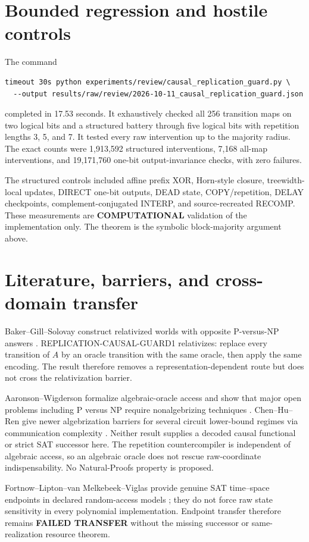 \documentclass[11pt]{article}
\begin{document}
\section{Bounded regression and hostile controls}
The command
\begin{verbatim}
timeout 30s python experiments/review/causal_replication_guard.py \
  --output results/raw/review/2026-10-11_causal_replication_guard.json
\end{verbatim}
completed in 17.53 seconds.  It exhaustively checked all 256 transition maps
on two logical bits and a structured battery through five logical bits with
repetition lengths 3, 5, and 7.  It tested every raw intervention up to the
majority radius.  The exact counts were 1,913,592 structured interventions,
7,168 all-map interventions, and 19,171,760 one-bit output-invariance checks,
with zero failures.

The structured controls included affine prefix XOR, Horn-style closure,
treewidth-local updates, DIRECT one-bit outputs, DEAD state, COPY/repetition,
DELAY checkpoints, complement-conjugated INTERP, and source-recreated RECOMP.
These measurements are \textbf{COMPUTATIONAL} validation of the implementation
only.  The theorem is the symbolic block-majority argument above.

\section{Literature, barriers, and cross-domain transfer}
Baker--Gill--Solovay construct relativized worlds with opposite P-versus-NP
answers \cite{bgs}.  REPLICATION-CAUSAL-GUARD1 relativizes: replace every
transition of $A$ by an oracle transition with the same oracle, then apply the
same encoding.  The result therefore removes a representation-dependent route
but does not cross the relativization barrier.

Aaronson--Wigderson formalize algebraic-oracle access and show that major open
problems including P versus NP require nonalgebrizing techniques \cite{aw}.
Chen--Hu--Ren give newer algebrization barriers for several circuit lower-bound
regimes via communication complexity \cite{chr}.  Neither result supplies a
decoded causal functional or strict SAT successor here.  The repetition
countercompiler is independent of algebraic access, so an algebraic oracle
does not rescue raw-coordinate indispensability.  No Natural-Proofs property
is proposed.

Fortnow--Lipton--van Melkebeek--Viglas provide genuine SAT time--space
endpoints in declared random-access models \cite{flmv}; they do not force raw
state sensitivity in every polynomial implementation.  Endpoint transfer
therefore remains \textbf{FAILED TRANSFER} without the missing successor or
same-realization resource theorem.
\end{document}
